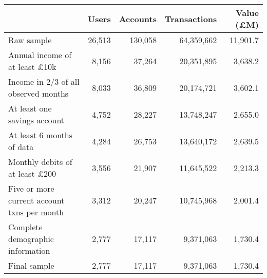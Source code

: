 \begin{tabular}{lrrrr}
\toprule
                                            &  Users & Accounts & Transactions & Value (\pounds M) \\
\midrule
                                 Raw sample & 26,513 &  130,058 &   64,359,662 &          11,901.7 \\
       Annual income of at least \pounds10k &  8,156 &   37,264 &   20,351,895 &           3,638.2 \\
       Income in 2/3 of all observed months &  8,033 &   36,809 &   20,174,721 &           3,602.1 \\
               At least one savings account &  4,752 &   28,227 &   13,748,247 &           2,655.0 \\
                  At least 6 months of data &  4,284 &   26,753 &   13,640,172 &           2,639.5 \\
      Monthly debits of at least \pounds200 &  3,556 &   21,907 &   11,645,522 &           2,213.3 \\
Five or more current account txns per month &  3,312 &   20,247 &   10,745,968 &           2,001.4 \\
           Complete demographic information &  2,777 &   17,117 &    9,371,063 &           1,730.4 \\
                               Final sample &  2,777 &   17,117 &    9,371,063 &           1,730.4 \\
\bottomrule
\end{tabular}
